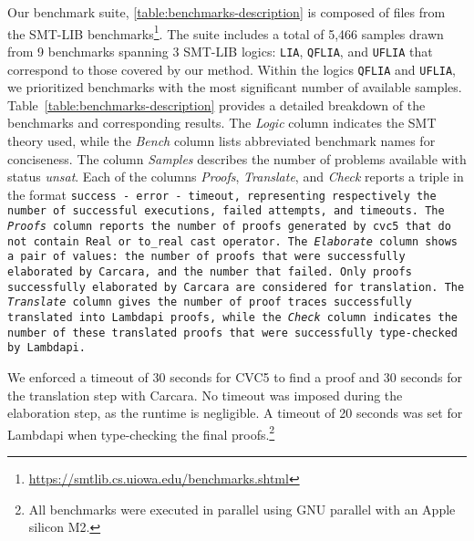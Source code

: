 Our benchmark suite, \cref{table:benchmarks-description} is composed of files from the SMT-LIB benchmarks\footnote{\url{https://smtlib.cs.uiowa.edu/benchmarks.shtml}}.
The suite includes a total of 5,466 samples drawn from 9 benchmarks spanning 3 SMT-LIB logics: \texttt{LIA}, \texttt{QFLIA}, and \texttt{UFLIA} that correspond to those covered by our method.
Within the logics \texttt{QFLIA} and \texttt{UFLIA}, we prioritized benchmarks with the most significant number of available samples.
Table~\ref{table:benchmarks-description} provides a detailed breakdown of the benchmarks and corresponding results.
The \emph{Logic} column indicates the SMT theory used, while the \emph{Bench} column lists abbreviated benchmark names for conciseness.
The column \emph{Samples} describes the number of problems available with status \emph{unsat}. 
Each of the columns \emph{Proofs}, \emph{Translate}, and \emph{Check} reports a triple in the format \tt{success - error - timeout}, representing respectively the number of successful executions, failed attempts, and timeouts. 
The \emph{Proofs} column reports the number of proofs generated by cvc5 that do not contain \lstinline[language=SMT,basicstyle=\ttfamily\footnotesize]|Real| or \lstinline[language=SMT,basicstyle=\ttfamily\footnotesize]|to_real| cast operator.
The \emph{Elaborate} column shows a pair of values: the number of proofs that were successfully elaborated by Carcara, and the number that failed. Only proofs successfully elaborated by Carcara are considered for translation.
The \emph{Translate} column gives the number of proof traces successfully translated into Lambdapi proofs, while the \emph{Check} column indicates the number of these translated proofs that were successfully type-checked by Lambdapi. 

We enforced a timeout of 30 seconds for CVC5 to find a proof and 30 seconds for the translation step with Carcara.
No timeout was imposed during the elaboration step, as the runtime is negligible.
A timeout of 20 seconds was set for Lambdapi when type-checking the final proofs.\footnote{All benchmarks were executed in parallel using GNU parallel \cite{tange_2025_15071920} with an Apple silicon M2.} %

